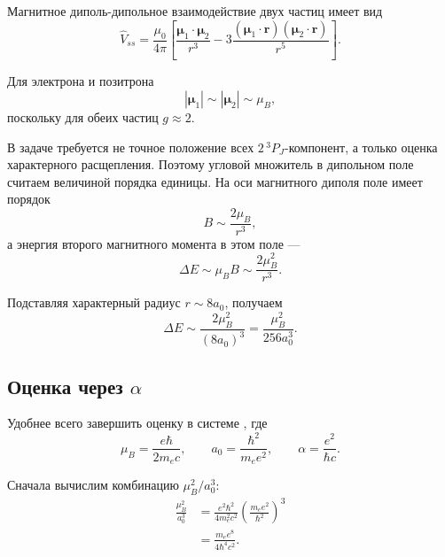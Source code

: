 \documentclass[../final.tex]{subfiles}
\begin{document}
Магнитное диполь-дипольное взаимодействие двух частиц имеет вид
%
\begin{equation*}
    \hat V_{ss}
    =
    \frac{\mu_0}{4\pi}
    \left[
        \frac{\boldsymbol\mu_1\cdot\boldsymbol\mu_2}{r^3}
        -
        3
        \frac{
            (\boldsymbol\mu_1\cdot\mathbf r)
            (\boldsymbol\mu_2\cdot\mathbf r)
        }{r^5}
    \right].
\end{equation*}

Для электрона и позитрона
%
\begin{equation*}
    |\boldsymbol\mu_1|
    \sim
    |\boldsymbol\mu_2|
    \sim
    \mu_B,
\end{equation*}
%
поскольку для обеих частиц $g\approx2$.

В задаче требуется не точное положение всех $2\,{}^3P_J$-компонент,
а только оценка характерного расщепления. Поэтому угловой множитель
в дипольном поле считаем величиной порядка единицы. На оси магнитного
диполя поле имеет порядок
%
\begin{equation*}
    B
    \sim
    \frac{2\mu_B}{r^3},
\end{equation*}
%
а энергия второго магнитного момента в этом поле ---
%
\begin{equation*}
    \Delta E
    \sim
    \mu_B B
    \sim
    \frac{2\mu_B^2}{r^3}.
\end{equation*}

Подставляя характерный радиус $r\sim8a_0$, получаем
%
\begin{equation*}
    \Delta E
    \sim
    \frac{2\mu_B^2}{(8a_0)^3}
    =
    \frac{\mu_B^2}{256a_0^3}.
\end{equation*}



\subsection*{Оценка через \texorpdfstring{$\alpha$}{alpha}}

Удобнее всего завершить оценку в системе , где
%
\begin{equation*}
    \mu_B
    =
    \frac{e\hbar}{2m_ec},
    \qquad
    a_0
    =
    \frac{\hbar^2}{m_ee^2},
    \qquad
    \alpha
    =
    \frac{e^2}{\hbar c}.
\end{equation*}

Сначала вычислим комбинацию $\mu_B^2/a_0^3$:
%
\begin{align*}
    \frac{\mu_B^2}{a_0^3}
    &=
    \frac{e^2\hbar^2}{4m_e^2c^2}
    \left(
        \frac{m_ee^2}{\hbar^2}
    \right)^3
    \\
    &=
    \frac{m_e e^8}{4\hbar^4c^2}.
\end{align*}
\end{document}
